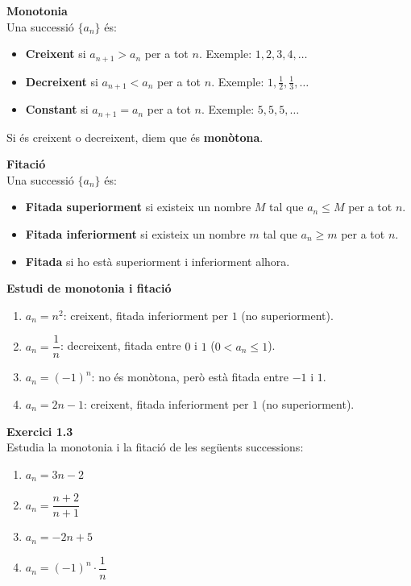 \documentclass[12pt]{article}
\begin{document}
\begin{concept}
\textbf{Monotonia}\\
Una successió $\{a_n\}$ és:
\begin{itemize}
    \item \textbf{Creixent} si $a_{n+1} > a_n$ per a tot $n$. Exemple: $1, 2, 3, 4, \dots$
    \item \textbf{Decreixent} si $a_{n+1} < a_n$ per a tot $n$. Exemple: $1, \tfrac{1}{2}, \tfrac{1}{3}, \dots$
    \item \textbf{Constant} si $a_{n+1} = a_n$ per a tot $n$. Exemple: $5, 5, 5, \dots$
\end{itemize}
Si és creixent o decreixent, diem que és \textbf{monòtona}.

\textbf{Fitació}\\
Una successió $\{a_n\}$ és:
\begin{itemize}
    \item \textbf{Fitada superiorment} si existeix un nombre $M$ tal que $a_n \le M$ per a tot $n$.
    \item \textbf{Fitada inferiorment} si existeix un nombre $m$ tal que $a_n \ge m$ per a tot $n$.
    \item \textbf{Fitada} si ho està superiorment i inferiorment alhora.
\end{itemize}
\end{concept}

\begin{exemple}
\textbf{Estudi de monotonia i fitació}
\begin{enumerate}[label=\alph*)]
    \item $a_n = n^2$: creixent, fitada inferiorment per $1$ (no superiorment).
    \item $a_n = \dfrac{1}{n}$: decreixent, fitada entre $0$ i $1$ ($0 < a_n \le 1$).
    \item $a_n = (-1)^n$: no és monòtona, però està fitada entre $-1$ i $1$.
    \item $a_n = 2n - 1$: creixent, fitada inferiorment per $1$ (no superiorment).
\end{enumerate}
\end{exemple}

\begin{exercici}
\textbf{Exercici 1.3}\\
Estudia la monotonia i la fitació de les següents successions:
\begin{enumerate}[label=\alph*)]
    \item $a_n = 3n - 2$
    \item $a_n = \dfrac{n+2}{n+1}$
    \item $a_n = -2n + 5$
    \item $a_n = (-1)^n \cdot \dfrac{1}{n}$
\end{enumerate}
\end{exercici}
\end{document}
